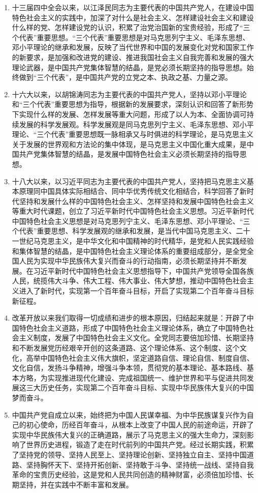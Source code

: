\documentclass[UTF8,11pt,a4paper]{ctexart}
\begin{document}
\begin{enumerate}[label=\arabic*., leftmargin=2.3em]
\item 十三届四中全会以来，以江泽民同志为主要代表的中国共产党人，在建设中国特色社会主义的实践中，加深了对什么是社会主义、怎样建设社会主义和建设什么样的党、怎样建设党的认识，积累了治党治国新的宝贵经验，形成了“三个代表”重要思想。“三个代表”重要思想是对马克思列宁主义、毛泽东思想、邓小平理论的继承和发展，反映了当代世界和中国的发展变化对党和国家工作的新要求，是加强和改进党的建设、推进我国社会主义自我完善和发展的强大理论武器，是中国共产党集体智慧的结晶，是党必须长期坚持的指导思想。始终做到“三个代表”，是中国共产党的立党之本、执政之基、力量之源。
\item 十六大以来，以胡锦涛同志为主要代表的中国共产党人，坚持以邓小平理论和“三个代表”重要思想为指导，根据新的发展要求，深刻认识和回答了新形势下实现什么样的发展、怎样发展等重大问题，形成了以人为本、全面协调可持续发展的科学发展观。科学发展观是同马克思列宁主义、毛泽东思想、邓小平理论、“三个代表”重要思想既一脉相承又与时俱进的科学理论，是马克思主义关于发展的世界观和方法论的集中体现，是马克思主义中国化重大成果，是中国共产党集体智慧的结晶，是发展中国特色社会主义必须长期坚持的指导思想。
\item 十八大以来，以习近平同志为主要代表的中国共产党人，坚持把马克思主义基本原理同中国具体实际相结合、同中华优秀传统文化相结合，科学回答了新时代坚持和发展什么样的中国特色社会主义、怎样坚持和发展中国特色社会主义等重大时代课题，创立了习近平新时代中国特色社会主义思想。习近平新时代中国特色社会主义思想是对马克思列宁主义、毛泽东思想、邓小平理论、“三个代表”重要思想、科学发展观的继承和发展，是当代中国马克思主义、二十一世纪马克思主义，是中华文化和中国精神的时代精华，是党和人民实践经验和集体智慧的结晶，是中国特色社会主义理论体系的重要组成部分，是全党全国人民为实现中华民族伟大复兴而奋斗的行动指南，必须长期坚持并不断发展。在习近平新时代中国特色社会主义思想指导下，中国共产党领导全国各族人民，统揽伟大斗争、伟大工程、伟大事业、伟大梦想，推动中国特色社会主义进入了新时代，实现第一个百年奋斗目标，开启了实现第二个百年奋斗目标新征程。
\item 改革开放以来我们取得一切成绩和进步的根本原因，归结起来就是：开辟了中国特色社会主义道路，形成了中国特色社会主义理论体系，确立了中国特色社会主义制度，发展了中国特色社会主义文化。全党同志要倍加珍惜、长期坚持和不断发展党历经艰辛开创的这条道路、这个理论体系、这个制度、这个文化，高举中国特色社会主义伟大旗帜，坚定道路自信、理论自信、制度自信、文化自信，发扬斗争精神，增强斗争本领，贯彻党的基本理论、基本路线、基本方略，为实现推进现代化建设、完成祖国统一、维护世界和平与促进共同发展这三大历史任务，实现第二个百年奋斗目标、实现中华民族伟大复兴的中国梦而奋斗。
\item 中国共产党自成立以来，始终把为中国人民谋幸福、为中华民族谋复兴作为自己的初心使命，历经百年奋斗，从根本上改变了中国人民的前途命运，开辟了实现中华民族伟大复兴的正确道路，展示了马克思主义的强大生命力，深刻影响了世界历史进程，锻造了走在时代前列的中国共产党。经过长期实践，积累了坚持党的领导、坚持人民至上、坚持理论创新、坚持独立自主、坚持中国道路、坚持胸怀天下、坚持开拓创新、坚持敢于斗争、坚持统一战线、坚持自我革命的宝贵历史经验，这是党和人民共同创造的精神财富，必须倍加珍惜、长期坚持，并在实践中不断丰富和发展。

\end{enumerate}
\end{document}
